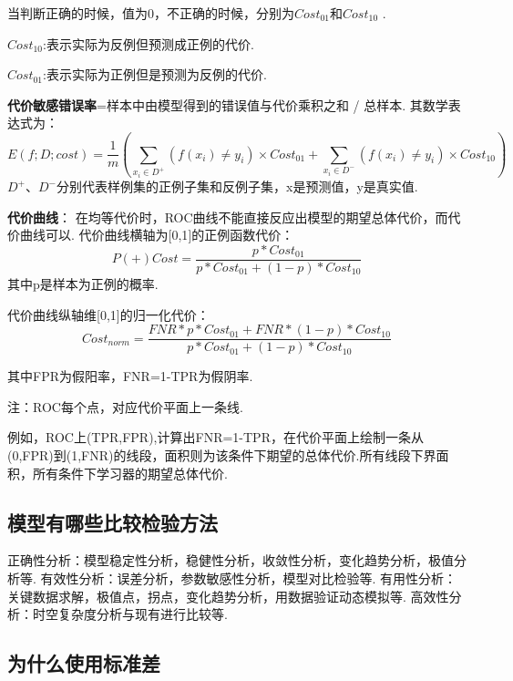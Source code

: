  

当判断正确的时候，值为0，不正确的时候，分别为$Cost_{01}​$和$Cost_{10}​$
.

$Cost_{10}$:表示实际为反例但预测成正例的代价.

$Cost_{01}$:表示实际为正例但是预测为反例的代价.

\textbf{代价敏感错误率}=样本中由模型得到的错误值与代价乘积之和 /
总样本. 其数学表达式为： \[
E(f;D;cost)=\frac{1}{m}\left( \sum_{x_{i} \in D^{+}}({f(x_i)\neq y_i})\times Cost_{01}+ \sum_{x_{i} \in D^{-}}({f(x_i)\neq y_i})\times Cost_{10}\right)
\]
$D^{+}、D^{-}​$分别代表样例集的正例子集和反例子集，x是预测值，y是真实值.

\textbf{代价曲线}：
在均等代价时，ROC曲线不能直接反应出模型的期望总体代价，而代价曲线可以.
代价曲线横轴为{[}0,1{]}的正例函数代价： \[
P(+)Cost=\frac{p*Cost_{01}}{p*Cost_{01}+(1-p)*Cost_{10}}
\] 其中p是样本为正例的概率.

代价曲线纵轴维{[}0,1{]}的归一化代价： \[
Cost_{norm}=\frac{FNR*p*Cost_{01}+FNR*(1-p)*Cost_{10}}{p*Cost_{01}+(1-p)*Cost_{10}}
\]

其中FPR为假阳率，FNR=1-TPR为假阴率.

注：ROC每个点，对应代价平面上一条线.

例如，ROC上(TPR,FPR),计算出FNR=1-TPR，在代价平面上绘制一条从(0,FPR)到(1,FNR)的线段，面积则为该条件下期望的总体代价.所有线段下界面积，所有条件下学习器的期望总体代价.

 

\subsection{模型有哪些比较检验方法}\label{ux6a21ux578bux6709ux54eaux4e9bux6bd4ux8f83ux68c0ux9a8cux65b9ux6cd5}

正确性分析：模型稳定性分析，稳健性分析，收敛性分析，变化趋势分析，极值分析等.
有效性分析：误差分析，参数敏感性分析，模型对比检验等.
有用性分析：关键数据求解，极值点，拐点，变化趋势分析，用数据验证动态模拟等.
高效性分析：时空复杂度分析与现有进行比较等.

\subsection{为什么使用标准差}\label{ux4e3aux4ec0ux4e48ux4f7fux7528ux6807ux51c6ux5dee}

